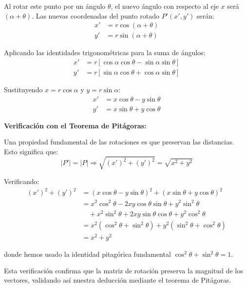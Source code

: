 Al rotar este punto por un ángulo $\theta$, el nuevo ángulo con respecto al eje $x$ será $(\alpha + \theta)$. Las nuevas coordenadas del punto rotado $P'(x', y')$ serán:
\begin{align*}
x' &= r \cos(\alpha + \theta) \\
y' &= r \sin(\alpha + \theta)
\end{align*}

Aplicando las identidades trigonométricas para la suma de ángulos:
\begin{align*}
x' &= r[\cos \alpha \cos \theta - \sin \alpha \sin \theta] \\
y' &= r[\sin \alpha \cos \theta + \cos \alpha \sin \theta]
\end{align*}

Sustituyendo $x = r \cos \alpha$ y $y = r \sin \alpha$:
\begin{align*}
x' &= x \cos \theta - y \sin \theta \\
y' &= x \sin \theta + y \cos \theta
\end{align*}

\textbf{Verificación con el Teorema de Pitágoras:}

Una propiedad fundamental de las rotaciones es que preservan las distancias. Esto significa que:
\begin{equation*}
|P'| = |P| \Rightarrow \sqrt{(x')^2 + (y')^2} = \sqrt{x^2 + y^2}
\end{equation*}

Verificando:
\begin{align*}
(x')^2 + (y')^2 &= (x \cos \theta - y \sin \theta)^2 + (x \sin \theta + y \cos \theta)^2 \\
&= x^2 \cos^2 \theta - 2xy \cos \theta \sin \theta + y^2 \sin^2 \theta \\
&\quad + x^2 \sin^2 \theta + 2xy \sin \theta \cos \theta + y^2 \cos^2 \theta \\
&= x^2(\cos^2 \theta + \sin^2 \theta) + y^2(\sin^2 \theta + \cos^2 \theta) \\
&= x^2 + y^2
\end{align*}

donde hemos usado la identidad pitagórica fundamental $\cos^2 \theta + \sin^2 \theta = 1$.

Esta verificación confirma que la matriz de rotación preserva la magnitud de los vectores, validando así nuestra deducción mediante el teorema de Pitágoras.
